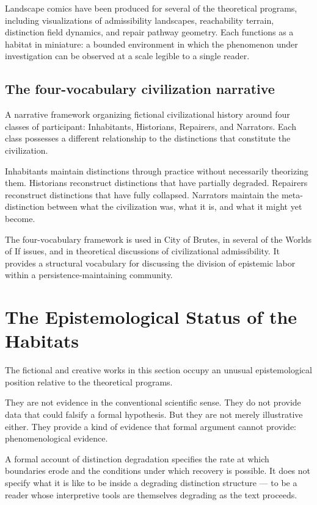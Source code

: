 \documentclass[12pt, openany]{book}
\begin{document}
Landscape comics have been produced for several of the theoretical
programs, including visualizations of admissibility landscapes, reachability
terrain, distinction field dynamics, and repair pathway geometry. Each
functions as a habitat in miniature: a bounded environment in which the
phenomenon under investigation can be observed at a scale legible to a
single reader.

\subsection{The four-vocabulary civilization narrative} A narrative framework
organizing fictional civilizational history around four classes of
participant: Inhabitants, Historians, Repairers, and Narrators. Each class
possesses a different relationship to the distinctions that constitute the
civilization.

Inhabitants maintain distinctions through practice without necessarily
theorizing them. Historians reconstruct distinctions that have partially
degraded. Repairers reconstruct distinctions that have fully collapsed.
Narrators maintain the meta-distinction between what the civilization was,
what it is, and what it might yet become.

The four-vocabulary framework is used in City of Brutes, in several of
the Worlds of If issues, and in theoretical discussions of civilizational
admissibility. It provides a structural vocabulary for discussing the
division of epistemic labor within a persistence-maintaining community.

\section{The Epistemological Status of the Habitats}

The fictional and creative works in this section occupy an unusual
epistemological position relative to the theoretical programs.

They are not evidence in the conventional scientific sense. They do not
provide data that could falsify a formal hypothesis. But they are not
merely illustrative either. They provide a kind of evidence that formal
argument cannot provide: phenomenological evidence.

A formal account of distinction degradation specifies the rate at which
boundaries erode and the conditions under which recovery is possible. It
does not specify what it is like to be inside a degrading distinction
structure — to be a reader whose interpretive tools are themselves
degrading as the text proceeds.
\end{document}
